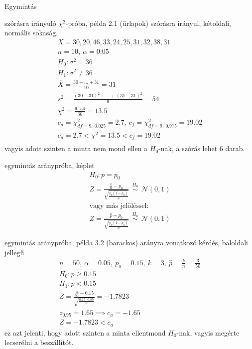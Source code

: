 \documentclass[12pt]{amsbook}
\begin{document}
\begin{spacing}{1.5}
\begin{section}{Egymintás}
\begin{subsection}{ szórásra irányuló $\chi^2$-próba, példa }
\label{1mszp}
   2.1 (űrlapok)
   szórásra irányul, kétoldali, normális sokaság.
   \begin{gather*}
   X=30, 20, 46, 33, 24, 25, 31, 32, 38, 31\\
   n=10,\ \alpha=0.05\\
   H_{0}:\sigma^2=36\\
   H_{1}:\sigma^2\neq36\\
   \overline{X}=\frac{30+\ldots+31}{10}=31\\
   s^2=\frac{(30-31)^2+\ldots+(31-31)^2}{9}=54\\
   \chi^2=\frac{9\cdot54}{36}=13.5\\
   c_a=\chi^2_{df=9,\ 0.025}=2.7,\ c_f=\chi^2_{df=9,\ 0.975}=19.02\\
   c_a=2.7 < \chi^2=13.5 < c_f=19.02\\
   \end{gather*}
   vagyis adott szinten a minta nem mond ellen a $H_0$-nak, a szórás lehet 6 darab.
\end{subsection}%




\begin{subsection}{ egymintás aránypróba, képlet }
\label{1mak}
   \begin{gather*}
   H_0: p = p_0\\
   Z=\frac{\frac{k}{n}-p_0}{\sqrt{\frac{p_0(1-p_0)}{n}}} \ \ \overset{H_0}{\sim} \ \ {\mathcal N}(0,1)\\
   \text{vagy más jelöléssel:}\\
   Z=\frac{\hat{p}-p_0}{\sqrt{\frac{p_0(1-p_0)}{n}}} \ \ \overset{H_0}{\sim} \ \ {\mathcal N}(0,1)
   \end{gather*}
\end{subsection}%


\begin{subsection}{ egymintás aránypróba, példa }
\label{1map}
   3.2 (barackos)
   arányra vonatkozó kérdés, baloldali jellegű
   \begin{gather*}
   n=50,\ \alpha=0.05,\ p_{0}=0.15,\ k=3,\ \hat{p}=\frac{k}{n}=\frac{3}{50}\\
   H_{0}: p\ge 0.15\\
   H_{1}: p < 0.15\\
   Z=\frac{\frac{3}{50}-0.15}{\sqrt{\frac{0.15\cdot 0.85}{50}}} = -1.7823\\
   z_{0.95}=1.65 \implies c_a = -1.65\\
   Z=-1.7823 < c_a
   \end{gather*}
   ez azt jelenti, hogy adott szinten a minta ellentmond $H_0$-nak,
   vagyis megérte lecserélni a beszállítót.
\end{subsection}%


\end{section}
\end{spacing}
\end{document}
